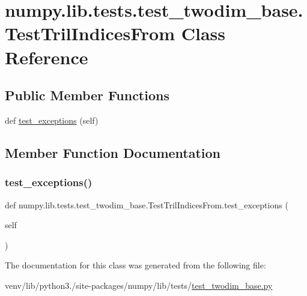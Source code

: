 \hypertarget{classnumpy_1_1lib_1_1tests_1_1test__twodim__base_1_1TestTrilIndicesFrom}{}\section{numpy.\+lib.\+tests.\+test\+\_\+twodim\+\_\+base.\+Test\+Tril\+Indices\+From Class Reference}
\label{classnumpy_1_1lib_1_1tests_1_1test__twodim__base_1_1TestTrilIndicesFrom}
\subsection*{Public Member Functions}
\begin{DoxyCompactItemize}
\item 
def \hyperlink{classnumpy_1_1lib_1_1tests_1_1test__twodim__base_1_1TestTrilIndicesFrom_ae89a3c7fcb0785a2529599d0d86c31eb}{test\+\_\+exceptions} (self)
\end{DoxyCompactItemize}


\subsection{Member Function Documentation}
\mbox{\label{classnumpy_1_1lib_1_1tests_1_1test__twodim__base_1_1TestTrilIndicesFrom_ae89a3c7fcb0785a2529599d0d86c31eb}} 
\subsubsection{\texorpdfstring{test\+\_\+exceptions()}{test\_exceptions()}}
{\footnotesize\ttfamily def numpy.\+lib.\+tests.\+test\+\_\+twodim\+\_\+base.\+Test\+Tril\+Indices\+From.\+test\+\_\+exceptions (\begin{DoxyParamCaption}\item[{}]{self }\end{DoxyParamCaption})}



The documentation for this class was generated from the following file\+:\begin{DoxyCompactItemize}
\item 
venv/lib/python3./site-\/packages/numpy/lib/tests/\hyperlink{test__twodim__base_8py}{test\+\_\+twodim\+\_\+base.\+py}\end{DoxyCompactItemize}
